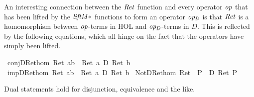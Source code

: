 An interesting connection between the $\mathit{Ret}$ function and every operator
$\mathit{op}$ that has been lifted by the $\mathit{liftM*}$ functions to form an
operator $\mathit{op_D}$ is that $\mathit{Ret}$ is a homomorphism between
$\mathit{op}$-terms in HOL and $\mathit{op_D}$-terms in $D$. This is
reflected by the following equations, which all hinge on the fact that the
operators have simply been lifted.
\begin{isabellebody}
\isanewline
{}\ conjD{\isacharunderscore}Ret{\isacharunderscore}hom{\isacharcolon}\ {\isachardoublequote}Ret\ {\isacharparenleft}a{\isasymand}b{\isacharparenright}\ {\isacharequal}\ {\isacharparenleft}{\isacharparenleft}Ret\ a{\isacharparenright}\ {\isasymand}\isactrlsub D\ {\isacharparenleft}Ret\ b{\isacharparenright}{\isacharparenright}{\isachardoublequote}\isanewline
{}\ impD{\isacharunderscore}Ret{\isacharunderscore}hom{\isacharcolon}\ {\isachardoublequote}Ret\ {\isacharparenleft}a{\isasymlongrightarrow}b{\isacharparenright}\ {\isacharequal}\ {\isacharparenleft}{\isacharparenleft}Ret\ a{\isacharparenright}\ {\isasymlongrightarrow}\isactrlsub D\ {\isacharparenleft}Ret\ b{\isacharparenright}{\isacharparenright}{\isachardoublequote}\isanewline
{}\ NotD{\isacharunderscore}Ret{\isacharunderscore}hom{\isacharcolon}\ {\isachardoublequote}Ret\ {\isacharparenleft}{\isasymnot}\ P{\isacharparenright}\ {\isacharequal}\ {\isacharparenleft}{\isasymnot}\isactrlsub D\ {\isacharparenleft}Ret\ P{\isacharparenright}{\isacharparenright}{\isachardoublequote}\isanewline
\end{isabellebody}
\noindent Dual statements hold for disjunction, equivalence and the like.

